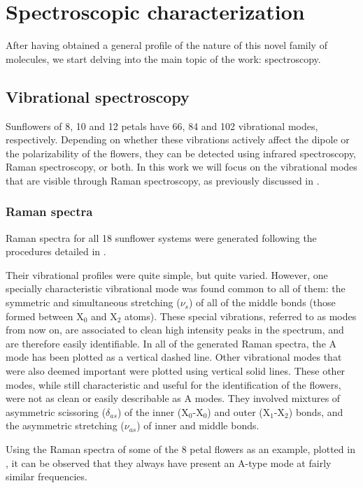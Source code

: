 \section{Spectroscopic characterization}
After having obtained a general profile of the nature of this novel family of molecules, we start delving into the main topic of the work: spectroscopy.

\subsection{Vibrational spectroscopy}
Sunflowers of 8, 10 and 12 petals have 66, 84 and 102 vibrational modes, respectively.
Depending on whether these vibrations actively affect the dipole or the polarizability of the flowers, they can be detected using infrared spectroscopy, Raman spectroscopy, or both.
In this work we will focus on the vibrational modes that are visible through Raman spectroscopy, as previously discussed in .

\subsubsection{Raman spectra}
Raman spectra for all 18 sunflower systems were generated following the procedures detailed in .

Their vibrational profiles were quite simple, but quite varied.
However, one specially characteristic vibrational mode was found common to all of them: the symmetric and simultaneous stretching ($\nu_\textit{s}$) of all of the middle bonds (those formed between X$_0$ and X$_2$ atoms).
These special vibrations, referred to as  modes from now on, are associated to clean high intensity peaks in the spectrum, and are therefore easily identifiable.
In all of the generated Raman spectra, the A mode has been plotted as a vertical dashed line.
Other vibrational modes that were also deemed important were plotted using vertical solid lines.
These other modes, while still characteristic and useful for the identification of the flowers, were not as clean or easily describable as A modes.
They involved mixtures of asymmetric scissoring ($\delta_\textit{as}$) of the inner (X$_0$-X$_0$) and outer (X$_1$-X$_2$) bonds, and the asymmetric stretching ($\nu_\textit{as}$) of inner and middle bonds.

Using the Raman spectra of some of the 8 petal flowers as an example, plotted in , it can be observed that they always have present an A-type mode at fairly similar frequencies.

